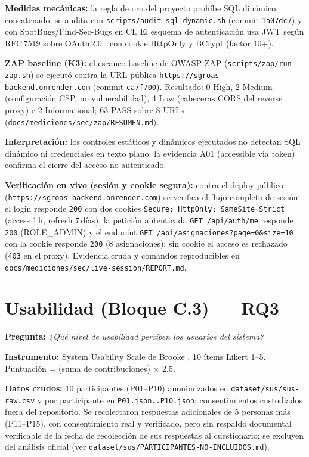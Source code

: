 \textbf{Medidas mecánicas:} la regla de oro del proyecto prohíbe SQL dinámico
concatenado; se audita con \texttt{scripts/audit-sql-dynamic.sh} (commit
\texttt{1a07dc7}) y con SpotBugs/Find-Sec-Bugs en CI. El esquema de autenticación
usa JWT según RFC\,7519 \cite{rfc7519} sobre OAuth\,2.0 \cite{rfc6749}, con cookie
HttpOnly y BCrypt (factor 10+).

\textbf{ZAP baseline (K3):} el escaneo baseline de OWASP ZAP
(\texttt{scripts/zap/run-zap.sh}) se ejecutó contra la URL pública
\texttt{https://sgroas-backend.onrender.com} (commit \texttt{ca7f700}). Resultado: 0
High, 2 Medium (configuración CSP, no vulnerabilidad), 4 Low (cabeceras CORS del
reverse proxy) e 2 Informational; 63 PASS sobre 8 URLs
(\texttt{docs/mediciones/sec/zap/RESUMEN.md}).

\textbf{Interpretación:} los controles estáticos y dinámicos ejecutados no detectan
SQL dinámico ni credenciales en texto plano; la evidencia A01 (accessible via
token) confirma el cierre del acceso no autenticado.

\textbf{Verificación en vivo (sesión y cookie segura):} contra el deploy público
(\texttt{https://sgroas-backend.onrender.com}) se verifica el flujo completo de
sesión: el login responde \texttt{200} con dos cookies
\texttt{Secure; HttpOnly; SameSite=Strict} (access 1\,h, refresh 7\,días), la petición
autenticada \texttt{GET /api/auth/me} responde \texttt{200} (ROLE\_ADMIN) y el
endpoint \texttt{GET /api/asignaciones?page=0\&size=10} con la cookie responde
\texttt{200} (8 asignaciones); sin cookie el acceso es rechazado (\texttt{403} en el
proxy). Evidencia cruda y comandos reproducibles en
\texttt{docs/mediciones/sec/live-session/REPORT.md}.

\section{Usabilidad (Bloque C.3) — RQ3}
\label{sec:sus}

\textbf{Pregunta:} \emph{¿Qué nivel de usabilidad perciben los usuarios del
sistema?}

\textbf{Instrumento:} System Usability Scale de Brooke \cite{brooke1996}, 10 ítems
Likert 1--5. Puntuación = (suma de contribuciones) $\times$ 2.5.

\textbf{Datos crudos:} 10 participantes (P01--P10) anonimizados en
\texttt{dataset/sus/sus-raw.csv} y por participante en
\texttt{P01.json..P10.json}; consentimientos custodiados fuera del repositorio.
Se recolectaron respuestas adicionales de 5 personas más (P11--P15), con
consentimiento real y verificado, pero sin respaldo documental verificable de
la fecha de recolección de sus respuestas al cuestionario; se excluyen del
análisis oficial (ver \texttt{dataset/sus/PARTICIPANTES-NO-INCLUIDOS.md}).

